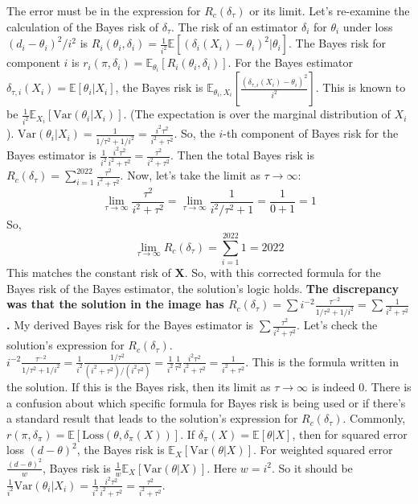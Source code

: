 \begin{enumerate}
The error must be in the expression for $R_c(\delta_\tau)$ or its limit.
Let's re-examine the calculation of the Bayes risk of $\delta_\tau$.
The risk of an estimator $\delta_i$ for $\theta_i$ under loss $(d_i-\theta_i)^2/i^2$ is $R_i(\theta_i, \delta_i) = \frac{1}{i^2} \mathbb{E}[( \delta_i(X_i) - \theta_i )^2 | \theta_i]$.
The Bayes risk for component $i$ is $r_i(\pi, \delta_i) = \mathbb{E}_{\theta_i}[R_i(\theta_i, \delta_i)]$.
For the Bayes estimator $\delta_{\tau,i}(X_i) = \mathbb{E}[\theta_i|X_i]$, the Bayes risk is $\mathbb{E}_{\theta_i, X_i}[\frac{(\delta_{\tau,i}(X_i)-\theta_i)^2}{i^2}]$.
This is known to be $\frac{1}{i^2} \mathbb{E}_{X_i}[\text{Var}(\theta_i|X_i)]$. (The expectation is over the marginal distribution of $X_i$).
$\text{Var}(\theta_i|X_i) = \frac{1}{1/\tau^2 + 1/i^2} = \frac{i^2\tau^2}{i^2+\tau^2}$.
So, the $i$-th component of Bayes risk for the Bayes estimator is $\frac{1}{i^2} \frac{i^2\tau^2}{i^2+\tau^2} = \frac{\tau^2}{i^2+\tau^2}$.
Then the total Bayes risk is $R_c(\delta_\tau) = \sum_{i=1}^{2022} \frac{\tau^2}{i^2+\tau^2}$.
Now, let's take the limit as $\tau \to \infty$:
\[
\lim_{\tau \to \infty} \frac{\tau^2}{i^2+\tau^2} = \lim_{\tau \to \infty} \frac{1}{i^2/\tau^2+1} = \frac{1}{0+1} = 1
\]So,
\[
\lim_{\tau \to \infty} R_c(\delta_\tau) = \sum_{i=1}^{2022} 1 = 2022
\]This matches the constant risk of $\mathbf{X}$.
So, with this corrected formula for the Bayes risk of the Bayes estimator, the solution's logic holds.
\textbf{The discrepancy was that the solution in the image has $R_c(\delta_\tau) = \sum i^{-2} \frac{\tau^{-2}}{1/\tau^2+1/i^2} = \sum \frac{1}{i^2+\tau^2}$.}
My derived Bayes risk for the Bayes estimator is $\sum \frac{\tau^2}{i^2+\tau^2}$.
Let's check the solution's expression for $R_c(\delta_\tau)$.
$i^{-2} \frac{\tau^{-2}}{1/\tau^2+1/i^2} = \frac{1}{i^2} \frac{1/\tau^2}{(i^2+\tau^2)/(i^2\tau^2)} = \frac{1}{i^2} \frac{1}{\tau^2} \frac{i^2\tau^2}{i^2+\tau^2} = \frac{1}{i^2+\tau^2}$.
This is the formula written in the solution. If this is the Bayes risk, then its limit as $\tau \to \infty$ is indeed $0$.
There is a confusion about which specific formula for Bayes risk is being used or if there's a standard result that leads to the solution's expression for $R_c(\delta_\tau)$.
Commonly, $r(\pi, \delta_\pi) = \mathbb{E}[\text{Loss}(\theta, \delta_\pi(X))]$.
If $\delta_\pi(X) = \mathbb{E}[\theta|X]$, then for squared error loss $(d-\theta)^2$, the Bayes risk is $\mathbb{E}_X[\text{Var}(\theta|X)]$.
For weighted squared error $\frac{(d-\theta)^2}{w}$, Bayes risk is $\frac{1}{w}\mathbb{E}_X[\text{Var}(\theta|X)]$.
Here $w=i^2$. So it should be $\frac{1}{i^2}\text{Var}(\theta_i|X_i) = \frac{1}{i^2} \frac{i^2\tau^2}{i^2+\tau^2} = \frac{\tau^2}{i^2+\tau^2}$.

\end{enumerate}

